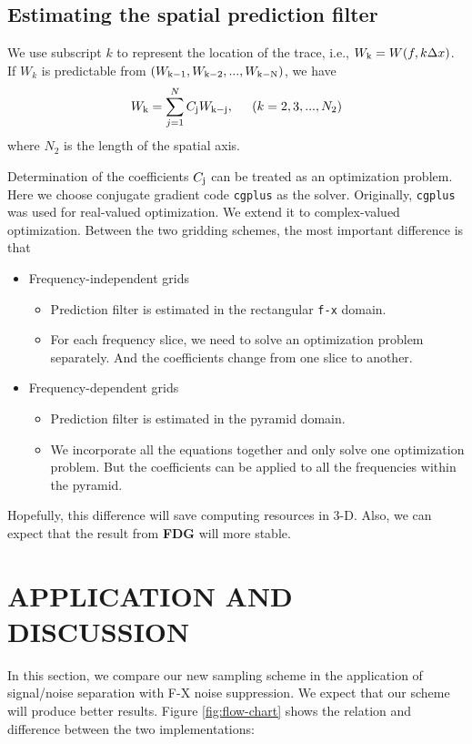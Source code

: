 \subsection{Estimating the spatial prediction filter}
\par
We use subscript $k$ to represent the location of the trace, 
i.e., $W_{\rm k} = W(f,k\Delta x)$. If $W_k$ is predictable from $(W_{\rm k-1}, 
W_{\rm k-2}, ..., W_{\rm k-N})$, we have
\begin{equation}
	W_{\rm k} = \sum_{j=1}^N C_{\rm j} W_{\rm k-j}, \hspace*{0.2in}(k=2,3,...,N_2)
\end{equation}
where $N_2$ is the length of the spatial axis.
\par
Determination of the coefficients $C_{\rm j}$ can be treated as an optimization
 problem. Here we choose conjugate gradient code {\tt cgplus} 
\cite{Claerbout.tdf.82} as the solver. Originally, {\tt cgplus} was used for 
real-valued optimization. We extend it to complex-valued optimization.  
Between the two gridding schemes, the most important difference is that
\begin{itemize}

	\item Frequency-independent grids
	\begin{itemize}
		\item Prediction filter is estimated in the rectangular 
		{\tt f-x} domain.
		\item For each frequency slice, we need to solve an 
		optimization problem separately. And the coefficients change 
		from one slice to another.
	\end{itemize}
	\item Frequency-dependent grids
	\begin{itemize}
		\item Prediction filter is estimated in the pyramid domain.
		\item We incorporate all the equations together and only solve 
		one optimization problem. But the coefficients can be applied 
		to all the frequencies within the pyramid. 
	\end{itemize}
\end{itemize}
Hopefully, this difference will save computing resources in 3-D. Also, we can 
expect that the result from {\bf FDG} will more stable.


\section{APPLICATION AND DISCUSSION}
\par
In this section, we compare our new sampling scheme in the application of 
signal/noise separation with F-X noise suppression. We expect that our scheme 
will produce better results. Figure \ref{fig:flow-chart} shows the relation and 
difference between the two implementations:

